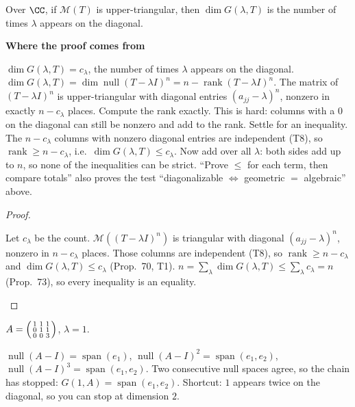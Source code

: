 \documentclass[10pt]{scrartcl}
\DeclareMathOperator{\nul}{null}
\DeclareMathOperator{\spn}{span}
\newcommand{\MM}{\mathcal M}
\newenvironment{motive}{\begin{mdframed}[style=thinkbox]\textbf{\color{OliveGreen!75!black}Where the proof comes from}\begin{description}[leftmargin=0.9em,labelindent=0pt,itemsep=2pt,topsep=2pt,font=\normalfont\bfseries\color{OliveGreen!70!black}]}{\end{description}\end{mdframed}}
\newenvironment{steps}{\begin{enumerate}[label=\arabic*.,leftmargin=1.5em,itemsep=2pt,topsep=2pt]}{\end{enumerate}}
\begin{document}
\begin{proposition*}
  Over $\CC$, if $\MM(T)$ is upper-triangular, then $\dim G(\lambda,T)$ is the number of times $\lambda$ appears on the diagonal.
\end{proposition*}
\begin{motive}
  \ii[Want.] $\dim G(\lambda,T)=c_\lambda$, the number of times $\lambda$ appears on the diagonal.
  \ii[Know.] $\dim G(\lambda,T)=\dim\nul(T-\lambda I)^n=n-\operatorname{rank}(T-\lambda I)^n$. The matrix of $(T-\lambda I)^n$ is upper-triangular with diagonal entries $(a_{jj}-\lambda)^n$, nonzero in exactly $n-c_\lambda$ places.
   Compute the rank exactly. This is hard: columns with a $0$ on the diagonal can still be nonzero and add to the rank.
   Settle for an inequality. The $n-c_\lambda$ columns with nonzero diagonal entries are independent (T8), so $\operatorname{rank}\ge n-c_\lambda$, i.e.\ $\dim G(\lambda,T)\le c_\lambda$. Now add over all $\lambda$: both sides add up to $n$, so none of the inequalities can be strict.
  \ii[Pattern.] ``Prove $\le$ for each term, then compare totals'' also proves the test ``diagonalizable $\iff$ geometric $=$ algebraic'' above.
\end{motive}
\begin{proof}
  \begin{steps}
    \ii Let $c_\lambda$ be the count. $\MM((T-\lambda I)^n)$ is triangular with diagonal $(a_{jj}-\lambda)^n$, nonzero in $n-c_\lambda$ places.
    \ii Those columns are independent (T8), so $\operatorname{rank}\ge n-c_\lambda$ and $\dim G(\lambda,T)\le c_\lambda$ (Prop.~70, T1).
    \ii $n=\sum_\lambda\dim G(\lambda,T)\le\sum_\lambda c_\lambda=n$ (Prop.~73), so every inequality is an equality.
  \end{steps}
\end{proof}

\begin{example*}
  $A=\begin{psmallmatrix}1&1&1\\0&1&1\\0&0&3\end{psmallmatrix}$, $\lambda=1$.
  \begin{steps}
    \ii $\nul(A-I)=\spn(e_1)$, $\nul(A-I)^2=\spn(e_1,e_2)$, $\nul(A-I)^3=\spn(e_1,e_2)$.
    \ii Two consecutive null spaces agree, so the chain has stopped: $G(1,A)=\spn(e_1,e_2)$.
    \ii Shortcut: $1$ appears twice on the diagonal, so you can stop at dimension $2$.
  \end{steps}
\end{example*}
\end{document}

